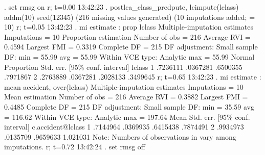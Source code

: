 . set rmsg on
r; t=0.00 13:42:23
{\smallskip}
. postlca_class_predpute, lcimpute(lclass) addm(10) seed(12345)
(216 missing values generated)
(10 imputations added; {} = 10)
r; t=0.05 13:42:23
{\smallskip}
. mi estimate : prop lclass
{\smallskip}
Multiple-imputation estimates     Imputations     =         10
Proportion estimation             Number of obs   =        216
                                  Average RVI     =     0.4594
                                  Largest FMI     =     0.3319
                                  Complete DF     =        215
DF adjustment:   Small sample     DF:     min     =      55.99
                                          avg     =      55.99
Within VCE type:     Analytic             max     =      55.99
{\smallskip}
             {\VBAR}                                   Normal
             {\VBAR} Proportion   Std. err.     [95\% conf. interval]
      lclass {\VBAR}
          1  {\VBAR}   .7236111   .0367281      .6500355    .7971867
          2  {\VBAR}   .2763889   .0367281      .2028133    .3499645
r; t=0.65 13:42:23
{\smallskip}
. mi estimate : mean accident, over(lclass)
{\smallskip}
Multiple-imputation estimates     Imputations     =         10
Mean estimation                   Number of obs   =        216
                                  Average RVI     =     0.3882
                                  Largest FMI     =     0.4485
                                  Complete DF     =        215
DF adjustment:   Small sample     DF:     min     =      35.59
                                          avg     =     116.62
Within VCE type:     Analytic             max     =     197.64
{\smallskip}
                  {\VBAR}       Mean   Std. err.     [95\% conf. interval]
c.accident@lclass {\VBAR}
               1  {\VBAR}   .7144964   .0369935      .6415438    .7874491
               2  {\VBAR}   .9934973   .0135709      .9659633    1.021031
Note: Numbers of observations in {} vary among imputations.
r; t=0.72 13:42:24
{\smallskip}
. set rmsg off
{\smallskip}
